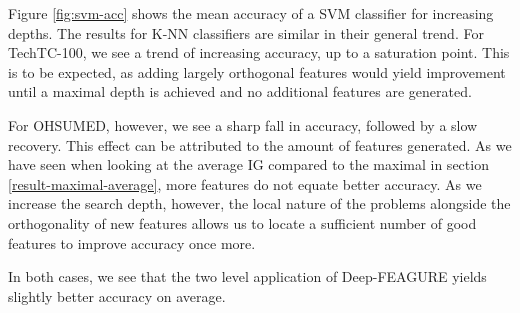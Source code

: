 \documentclass[twoside,11pt]{article}
\theoremstyle{definition}
\begin{document}
Figure \ref{fig:svm-acc} shows the mean accuracy of a SVM classifier for increasing depths. The results for K-NN classifiers are similar in their general trend. For TechTC-100, we see a trend of increasing accuracy, up to a saturation point. This is to be expected, as adding largely orthogonal features would yield improvement until a maximal depth is achieved and no additional features are generated.

For OHSUMED, however, we see a sharp fall in accuracy, followed by a slow recovery. 
This effect can be attributed to the amount of features generated. As we have seen when looking at the average IG compared to the maximal in section \ref{result-maximal-average}, more features do not equate better accuracy. As we increase the search depth, however, the local nature of the problems alongside the orthogonality of new features allows us to locate a sufficient number of good features to improve accuracy once more.

In both cases, we see that the two level application of Deep-FEAGURE yields slightly better accuracy on average.



\end{document}
